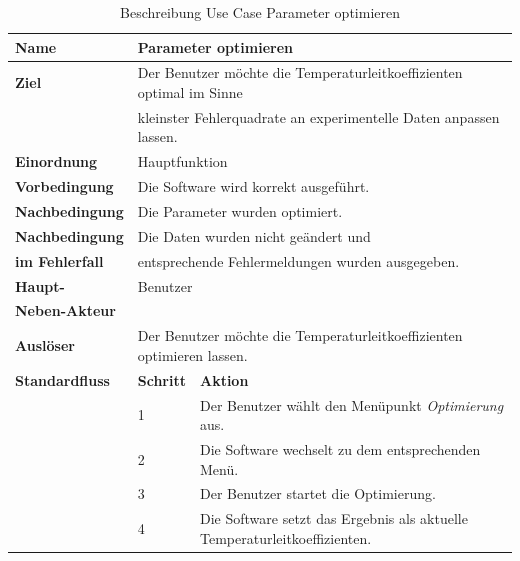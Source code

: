 \begin{table} [H]
	\centering
	\begin{tabular}{|l|l|l|}
		\hline
		\textbf{Name} 			& \multicolumn{2}{|l|}{Parameter optimieren}  \\
		\hline
		\textbf{Ziel} 			& \multicolumn{2}{|l|}{Der Benutzer möchte die Temperaturleitkoeffizienten optimal im Sinne}\\
								& \multicolumn{2}{|l|}{kleinster Fehlerquadrate an experimentelle Daten anpassen lassen.}\\
		\hline
		\textbf{Einordnung}		& \multicolumn{2}{|l|}{Hauptfunktion}\\
		\hline
		\textbf{Vorbedingung}	& \multicolumn{2}{|l|}{Die Software wird korrekt ausgeführt.} \\
		\hline
		\textbf{Nachbedingung}	& \multicolumn{2}{|l|}{Die Parameter wurden optimiert.}\\
		\hline
		\textbf{Nachbedingung} 	& \multicolumn{2}{|l|}{Die Daten wurden nicht geändert und}\\
		\textbf{im Fehlerfall}	& \multicolumn{2}{|l|}{entsprechende Fehlermeldungen wurden ausgegeben.}\\
		\hline
		\textbf{Haupt-} 		& \multicolumn{2}{|l|}{Benutzer}\\
		\textbf{Neben-Akteur}	& \multicolumn{2}{|l|}{	}			\\
		\hline
		\textbf{Auslöser} 		& \multicolumn{2}{|l|}{Der Benutzer möchte die Temperaturleitkoeffizienten optimieren lassen.} \\
		\hline 
		\textbf{Standardfluss} & \textbf{Schritt} & \textbf{Aktion} \\
		\hline
		&	1	& Der Benutzer wählt den Menüpunkt \emph{Optimierung} aus. \\
		\cline{2-3}
		&	2	& Die Software wechselt zu dem entsprechenden Menü.\\
		\cline{2-3}
		&	3	& Der Benutzer startet die Optimierung.\\
		\cline{2-3}
		&	4	& Die Software setzt das Ergebnis als aktuelle Temperaturleitkoeffizienten.\\
		\hline
	\end{tabular}
	\caption{Beschreibung Use Case Parameter optimieren}
	\label{Beschreibung Use Case Parameter optimieren}
\end{table}

